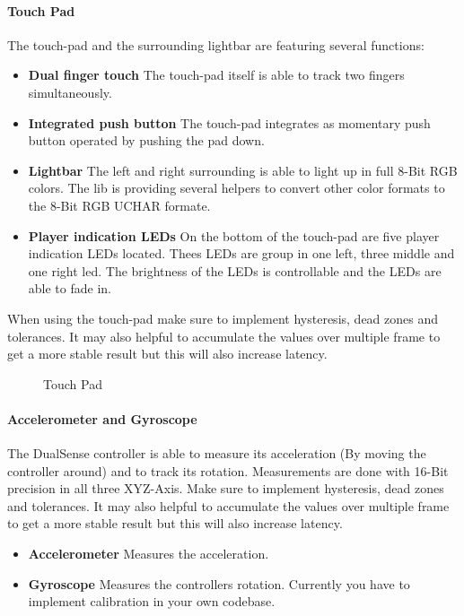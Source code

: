 \paragraph{Touch Pad}
The touch-pad and the surrounding lightbar are featuring several functions:
\begin{itemize}
	\item \textbf{Dual finger touch} The touch-pad itself is able to track two fingers simultaneously.
	\item \textbf{Integrated push button} The touch-pad integrates as momentary push button operated by pushing the pad down.
	\item \textbf{Lightbar} The left and right surrounding is able to light up in full 8-Bit RGB colors. The lib is providing several helpers to convert other color formats to the 8-Bit RGB UCHAR formate.
	\item \textbf{Player indication LEDs} On the bottom of the touch-pad are five player indication LEDs located. Thees LEDs are group in one left, three middle and one right led. The brightness of the LEDs is controllable and the LEDs are able to fade in.
\end{itemize}
When using the touch-pad make sure to implement hysteresis, dead zones and tolerances. It may also helpful to accumulate the values over multiple frame to get a more stable result but this will also increase latency. 
\begin{figure}[H]
    \centering
    \caption{Touch Pad}
\end{figure}

\paragraph{Accelerometer and Gyroscope}
The DualSense controller is able to measure its acceleration (By moving the controller around) and to track its rotation. Measurements are done with 16-Bit precision in all three XYZ-Axis. Make sure to implement hysteresis, dead zones and tolerances. It may also helpful to accumulate the values over multiple frame to get a more stable result but this will also increase latency.
\begin{itemize}
	\item \textbf{Accelerometer} Measures the acceleration.
	\item \textbf{Gyroscope} Measures the controllers rotation. Currently you have to implement calibration in your own codebase. 
\end{itemize}

